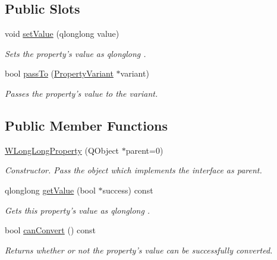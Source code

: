 \subsection*{Public Slots}
\begin{DoxyCompactItemize}
\item 
void \hyperlink{class_w_long_long_property_aef758f4156c156c6a4750f81fd673f65}{set\-Value} (qlonglong value)
\begin{DoxyCompactList}\small\item\em Sets the property's value as qlonglong . \end{DoxyCompactList}\item 
bool \hyperlink{class_w_long_long_property_aae25a17ef3af73f647799dbc08be3dcd}{pass\-To} (\hyperlink{class_property_variant}{Property\-Variant} $\ast$variant)
\begin{DoxyCompactList}\small\item\em Passes the property's value to the variant. \end{DoxyCompactList}\end{DoxyCompactItemize}
\subsection*{Public Member Functions}
\begin{DoxyCompactItemize}
\item 
\hyperlink{class_w_long_long_property_a9005bf9802f0368cacd6d81e77abb514}{W\-Long\-Long\-Property} (Q\-Object $\ast$parent=0)
\begin{DoxyCompactList}\small\item\em Constructor. Pass the object which implements the interface as parent. \end{DoxyCompactList}\item 
qlonglong \hyperlink{class_w_long_long_property_abae79b01d411ec7f44aa2d93289ad63f}{get\-Value} (bool $\ast$success) const 
\begin{DoxyCompactList}\small\item\em Gets this property's value as qlonglong . \end{DoxyCompactList}\item 
bool \hyperlink{class_w_long_long_property_a5b553e3d82d48cb661ef6180fa8ed76e}{can\-Convert} () const 
\begin{DoxyCompactList}\small\item\em Returns whether or not the property's value can be successfully converted. \end{DoxyCompactList}\end{DoxyCompactItemize}
